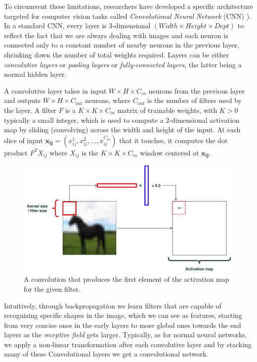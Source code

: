 \documentclass[LaM,binding=0.6cm]{./packages/sapthesis/sapthesis}
\begin{document}
            To circumvent these limitations, researchers have developed a specific architecture targeted for computer vision tasks called \textit{Convolutional Neural Network} (CNN) \cite{cnn}).
            In a standard CNN, every layer is $3$-dimensional $(Width \times Height \times Dept) $ to reflect the fact that we are always dealing with images 
            and each neuron is connected only to a constant number of nearby neurons in the previous layer, shrinking down the number of total weights required.
            Layers can be either \textit{convolutive layers} or \textit{pooling layers} or \textit{fully-connected layers}, the latter being a normal hidden layer.

            A convolutive layer takes in input $W \times H \times C_{in}$ neurons from the previous layer and outputs $W \times H \times C_{out}$ neurons, where $ C_{out}$
            is the number of filters used by the layer. A filter $F$ is a $K \times K \times C_{in}$ matrix of trainable weights, with $K>0$ typically a small integer, which is used to
            compute a 2-dimensional activation map by sliding (convolving) across the width and height of the input. At each slice of input 
            $ \mathbf{x_{ij}} = (x^{1}_{ij}, x^{2}_{ij}, \ldots, x^{C_{in}}_{ij})$ that it touches, it computes the dot product $ F^{T}X_{ij}$
            where $X_{ij}$ is the $K \times K \times C_{in}$ window centered at $\mathbf{x_{ij}}$.
            \begin{figure}[hb!]
                \centering
                \includegraphics[scale=0.30]{convolution}
                \caption{A convolution that produces the first element of the activation map for the given filter.}
                \label{fig:conv}
            \end{figure}
            Intuitively, through backpropagation we learn filters that are capable of recognizing specific shapes in the image, which we can see as features,
            starting from very concise ones in the early layers to more global ones towards the end layers as the \textit{receptive field} gets larger. 
            Typically, as for normal neural networks, we apply a non-linear transformation after each convolutive layer and by stacking many of these Convolutional
            layers we get a convolutional network.
            
\end{document}
